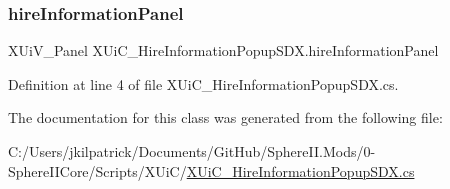 \subsubsection{\texorpdfstring{hireInformationPanel}{hireInformationPanel}}
{\footnotesize\ttfamily X\+Ui\+V\+\_\+\+Panel X\+Ui\+C\+\_\+\+Hire\+Information\+Popup\+S\+D\+X.\+hire\+Information\+Panel}



Definition at line 4 of file X\+Ui\+C\+\_\+\+Hire\+Information\+Popup\+S\+D\+X.\+cs.



The documentation for this class was generated from the following file\+:\begin{DoxyCompactItemize}
\item 
C\+:/\+Users/jkilpatrick/\+Documents/\+Git\+Hub/\+Sphere\+I\+I.\+Mods/0-\/\+Sphere\+I\+I\+Core/\+Scripts/\+X\+Ui\+C/\mbox{\hyperlink{_x_ui_c___hire_information_popup_s_d_x_8cs}{X\+Ui\+C\+\_\+\+Hire\+Information\+Popup\+S\+D\+X.\+cs}}\end{DoxyCompactItemize}
